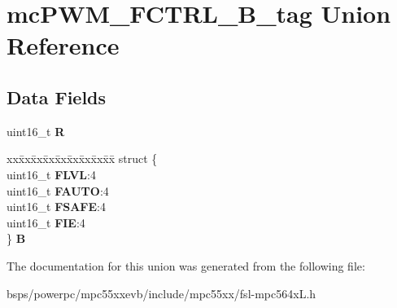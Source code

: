 \hypertarget{unionmcPWM__FCTRL__16B__tag}{}\section{mc\+P\+W\+M\+\_\+\+F\+C\+T\+R\+L\+\_\+B\+\_\+tag Union Reference}
\label{unionmcPWM__FCTRL__16B__tag}
\subsection*{Data Fields}
\begin{DoxyCompactItemize}
\item 
\mbox{\label{unionmcPWM__FCTRL__16B__tag_af66dd80d3c552ec7ff2b53b69dddf0c1}} 
uint16\+\_\+t {\bfseries R}
\item 
\mbox{\label{unionmcPWM__FCTRL__16B__tag_a3bdd13308cefd6e39482d1dab7d43369}} 
\begin{tabbing}
xx\=xx\=xx\=xx\=xx\=xx\=xx\=xx\=xx\=\kill
struct \{\\
\>uint16\_t {\bfseries FLVL}:4\\
\>uint16\_t {\bfseries FAUTO}:4\\
\>uint16\_t {\bfseries FSAFE}:4\\
\>uint16\_t {\bfseries FIE}:4\\
\} {\bfseries B}\\

\end{tabbing}\end{DoxyCompactItemize}


The documentation for this union was generated from the following file\+:\begin{DoxyCompactItemize}
\item 
bsps/powerpc/mpc55xxevb/include/mpc55xx/fsl-\/mpc564x\+L.\+h\end{DoxyCompactItemize}
